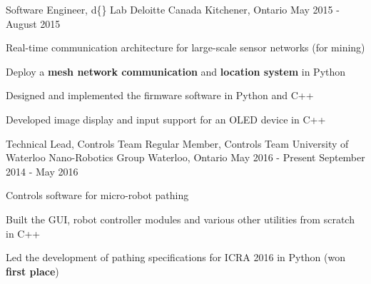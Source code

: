 \begin{cventries}
\cventry
{Software Engineer, d\{\} Lab}
{Deloitte Canada} %
{Kitchener, Ontario} %
{May 2015 - August 2015} %
{
Real-time communication architecture for large-scale sensor networks (for mining)
\begin{cvitems}
\item[]
\item {Deploy a \textbf{mesh network communication} and \textbf{location system} in Python}
\item {Designed and implemented the firmware software in Python and C++}
\item {Developed image display and input support for an OLED device in C++}
\end{cvitems}
}


\cventry
{Technical Lead, Controls Team \newline {\vspace{-.75mm}}
Regular Member, Controls Team}
{University of Waterloo Nano-Robotics Group}
{Waterloo, Ontario}
{May 2016 - Present \newline {\vspace{-1mm}}
September 2014 - May 2016} %
{ %
Controls software for micro-robot pathing
\begin{cvitems}
\item[]
\item {Built the GUI, robot controller modules and various other utilities from scratch in C++}
\item {Led the development of pathing specifications for ICRA 2016 in Python (won \textbf{first place})}
\end{cvitems} 
}


\end{cventries}
